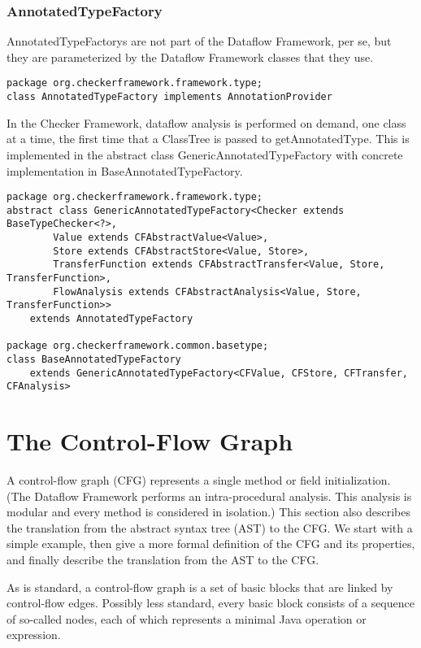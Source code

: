 \subsubsection{AnnotatedTypeFactory}
\label{sec:annotated_type_factory_classes}

AnnotatedTypeFactorys are not part of the Dataflow Framework, per se,
but they are parameterized by the Dataflow Framework classes that they
use.

\begin{verbatim}
package org.checkerframework.framework.type;
class AnnotatedTypeFactory implements AnnotationProvider
\end{verbatim}

In the Checker Framework, dataflow analysis is performed on demand,
one class at a time, the first time that a ClassTree is passed to
getAnnotatedType.  This is implemented in the abstract class
GenericAnnotatedTypeFactory with concrete implementation in
BaseAnnotatedTypeFactory.

\begin{verbatim}
package org.checkerframework.framework.type;
abstract class GenericAnnotatedTypeFactory<Checker extends BaseTypeChecker<?>,
        Value extends CFAbstractValue<Value>,
        Store extends CFAbstractStore<Value, Store>,
        TransferFunction extends CFAbstractTransfer<Value, Store, TransferFunction>,
        FlowAnalysis extends CFAbstractAnalysis<Value, Store, TransferFunction>>
    extends AnnotatedTypeFactory

package org.checkerframework.common.basetype;
class BaseAnnotatedTypeFactory
    extends GenericAnnotatedTypeFactory<CFValue, CFStore, CFTransfer, CFAnalysis>
\end{verbatim}


\section{The Control-Flow Graph}
\label{sec:cfg}

A control-flow graph (CFG) represents a single method or field
initialization.  (The Dataflow Framework performs an intra-procedural
analysis.  This analysis is modular and every method is considered in
isolation.)
This section also describes the translation from the abstract syntax tree
(AST) to the CFG\@.
We start with a simple example, then give a more formal
definition of the CFG and its properties, and finally describe the
translation from the AST to the CFG.

As is standard, a control-flow graph is a set of
basic blocks that are linked by control-flow edges. Possibly less
standard, every basic block consists of a sequence of so-called nodes,
each of which represents a minimal Java operation or expression.


